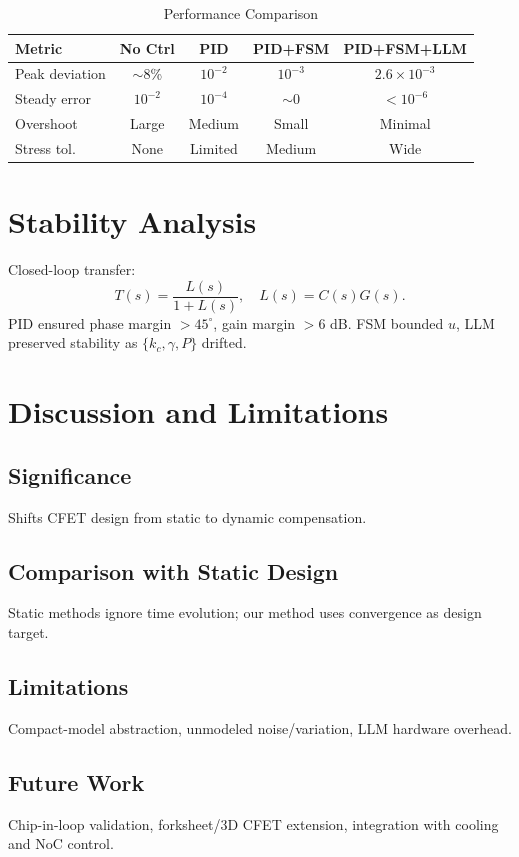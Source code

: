 \documentclass[conference]{IEEEtran}
\begin{document}
\begin{table}[h]
\renewcommand{\arraystretch}{1.1}
\caption{Performance Comparison}
\centering
\begin{tabular}{|l|c|c|c|c|}
\hline
Metric & No Ctrl & PID & PID+FSM & PID+FSM+LLM \\
\hline
Peak deviation & $\sim$8\% & $10^{-2}$ & $10^{-3}$ & $2.6\times 10^{-3}$ \\
Steady error   & $10^{-2}$ & $10^{-4}$ & $\sim$0 & $<10^{-6}$ \\
Overshoot      & Large     & Medium    & Small   & Minimal \\
Stress tol.    & None      & Limited   & Medium  & Wide \\
\hline
\end{tabular}
\end{table}

\section{Stability Analysis}
Closed-loop transfer:
\[
T(s) = \frac{L(s)}{1+L(s)}, \quad L(s)=C(s)G(s).
\]
PID ensured phase margin $>45^\circ$, gain margin $>6$ dB. FSM bounded $u$, LLM preserved stability as $\{k_c,\gamma,P\}$ drifted.

\section{Discussion and Limitations}
\subsection{Significance}
Shifts CFET design from static to dynamic compensation.  
\subsection{Comparison with Static Design}
Static methods ignore time evolution; our method uses convergence as design target.  
\subsection{Limitations}
Compact-model abstraction, unmodeled noise/variation, LLM hardware overhead.  
\subsection{Future Work}
Chip-in-loop validation, forksheet/3D CFET extension, integration with cooling and NoC control.  
\end{document}
